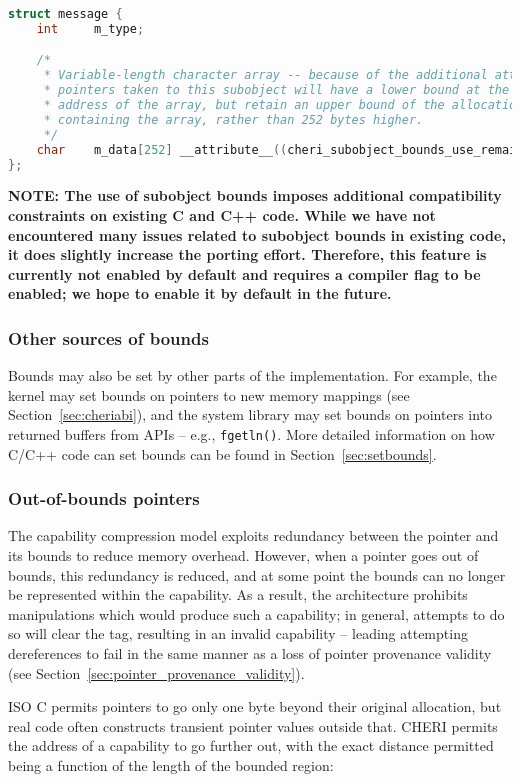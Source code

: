 \documentclass[11pt]{article}
\newcommand{\note}[2]{{\color{blue}[ Note: #1 - #2]}}
\renewcommand{\note}[2]{}
\newcommand{\psnote}[1]{\note{#1}{Peter S.}}
\begin{document}
\begin{lstlisting}[language={C}]
struct message {
    int     m_type;

    /*
     * Variable-length character array -- because of the additional attribute,
     * pointers taken to this subobject will have a lower bound at the first
     * address of the array, but retain an upper bound of the allocation
     * containing the array, rather than 252 bytes higher.
     */
    char    m_data[252] __attribute__((cheri_subobject_bounds_use_remaining_size));
};
\end{lstlisting}

\textbf{NOTE:
The use of subobject bounds imposes additional compatibility constraints on
existing C and C++ code. While we have not encountered many issues related to
subobject bounds in existing code, it does slightly increase the porting effort.
Therefore, this feature is currently not enabled by default and requires a compiler
flag to be enabled; we hope to enable it by default in the future.}


\subsubsection{Other sources of bounds}

Bounds may also be set by other parts of the implementation.
For example, the kernel may set bounds on pointers to new memory mappings (see
Section~\ref{sec:cheriabi}), and the system library may set bounds on pointers
into returned buffers from APIs -- e.g., \texttt{fgetln()}.
More detailed information on how C/C++ code can set bounds can be found in
Section~\ref{sec:setbounds}.

\subsubsection{Out-of-bounds pointers}

The capability compression model exploits redundancy between the pointer and
its bounds to reduce memory overhead.
However, when a pointer goes out of bounds, this redundancy is reduced, and at
some point the bounds can no longer be represented within the capability.
As a result, the architecture prohibits manipulations which would produce such
a capability; in general, attempts to do so will clear the tag, resulting in
an invalid capability -- leading attempting dereferences to fail in the same
manner as a loss of pointer provenance validity (see
Section~\ref{sec:pointer_provenance_validity}).
\psnote{Comment on whether that should immediately trap instead?}
ISO C permits pointers to go only one byte beyond their original
allocation, but real code often \psnote{not sure how strong to be there}
constructs transient pointer values outside that. 
CHERI permits the address of a capability to go further out, with
the exact distance permitted being 
a function of the length of the bounded region:
\end{document}
